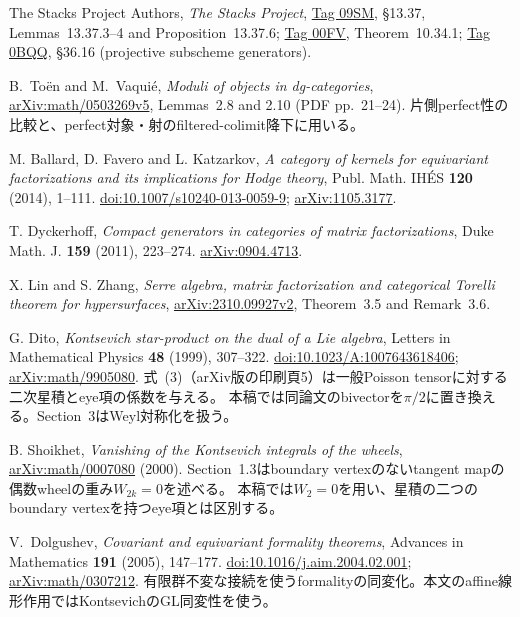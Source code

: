 The Stacks Project Authors, \emph{The Stacks Project},
\href{https://stacks.math.columbia.edu/tag/09SM}{Tag 09SM},
\S13.37, Lemmas~13.37.3--4 and Proposition~13.37.6;
\href{https://stacks.math.columbia.edu/tag/00FV}{Tag 00FV}, Theorem~10.34.1;
\href{https://stacks.math.columbia.edu/tag/0BQQ}{Tag 0BQQ}, \S36.16 (projective subscheme generators).

B.~To\"en and M.~Vaqui\'e, \emph{Moduli of objects in dg-categories},
\href{https://arxiv.org/abs/math/0503269v5}{arXiv:math/0503269v5},
Lemmas~2.8 and 2.10 (PDF pp.~21--24).
片側perfect性の比較と、perfect対象・射のfiltered-colimit降下に用いる。

M. Ballard, D. Favero and L. Katzarkov,
\emph{A category of kernels for equivariant factorizations and its implications for Hodge theory},
Publ. Math. IH\'ES \textbf{120} (2014), 1--111.
\href{https://doi.org/10.1007/s10240-013-0059-9}{doi:10.1007/s10240-013-0059-9};
\href{https://arxiv.org/abs/1105.3177}{arXiv:1105.3177}.

T. Dyckerhoff,
\emph{Compact generators in categories of matrix factorizations},
Duke Math. J. \textbf{159} (2011), 223--274.
\href{https://arxiv.org/abs/0904.4713}{arXiv:0904.4713}.

X. Lin and S. Zhang,
\emph{Serre algebra, matrix factorization and categorical Torelli theorem for hypersurfaces},
\href{https://arxiv.org/html/2310.09927v2}{arXiv:2310.09927v2},
Theorem~3.5 and Remark~3.6.

G. Dito,
\emph{Kontsevich star-product on the dual of a Lie algebra},
Letters in Mathematical Physics \textbf{48} (1999), 307--322.
\href{https://doi.org/10.1023/A:1007643618406}{doi:10.1023/A:1007643618406};
\href{https://arxiv.org/abs/math/9905080}{arXiv:math/9905080}.
式~(3)（arXiv版の印刷頁5）は一般Poisson tensorに対する二次星積とeye項の係数を与える。
本稿では同論文のbivectorを$\pi/2$に置き換える。Section~3はWeyl対称化を扱う。

B. Shoikhet,
\emph{Vanishing of the Kontsevich integrals of the wheels},
\href{https://arxiv.org/abs/math/0007080}{arXiv:math/0007080} (2000).
Section~1.3はboundary vertexのないtangent mapの偶数wheelの重み$W_{2k}=0$を述べる。
本稿では$W_2=0$を用い、星積の二つのboundary vertexを持つeye項とは区別する。

V.~Dolgushev,
\emph{Covariant and equivariant formality theorems},
Advances in Mathematics \textbf{191} (2005), 147--177.
\href{https://doi.org/10.1016/j.aim.2004.02.001}{doi:10.1016/j.aim.2004.02.001};
\href{https://arxiv.org/abs/math/0307212}{arXiv:math/0307212}.
有限群不変な接続を使うformalityの同変化。本文のaffine線形作用ではKontsevichのGL同変性を使う。

